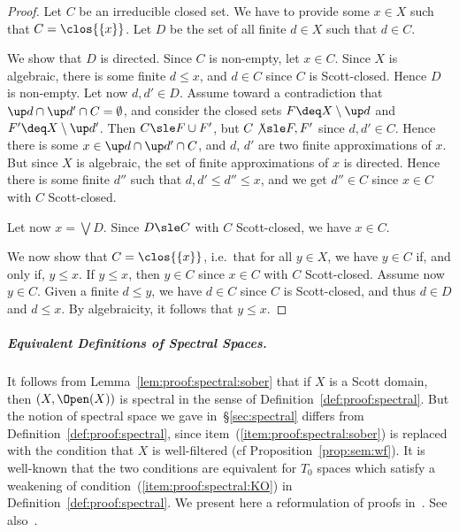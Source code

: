 \begin{proof}
Let $C$ be an irreducible closed set.
We have to provide some $x \in X$ such that $C = \clos{\{x\}}$.
Let $D$ be the set of all finite $d \in X$ such that
$d \in C$.

We show that $D$ is directed.
Since $C$ is non-empty, let $x \in C$.
Since $X$ is algebraic, there is some finite $d \leq x$,
and $d \in C$ since $C$ is Scott-closed.
Hence $D$ is non-empty.
Let now $d, d' \in D$.
Assume toward a contradiction that 
$\up d \cap \up d' \cap C = \emptyset$,
and consider the closed sets $F \deq X \setminus \up d$
and $F' \deq X \setminus \up d'$.
Then $C \sle F \cup F'$, but $C \not\sle F, F'$
since $d,d' \in C$.
Hence there is some $x \in \up d \cap \up d' \cap C$,
and $d$, $d'$ are two finite approximations of $x$.
But since $X$ is algebraic, the set of finite approximations of $x$
is directed.
Hence there is some finite $d''$ such that $d,d' \leq d'' \leq x$,
and we get $d'' \in C$ since $x \in C$ with $C$ Scott-closed.

Let now $x = \bigvee D$.
Since $D \sle C$ with $C$ Scott-closed, we have $x \in C$.

We now show that $C = \clos{\{x\}}$,
i.e.\ that for all $y \in X$, we have $y \in C$ if, and only if, $y \leq x$.
If $y \leq x$, then $y \in C$ since $x \in C$ with $C$ Scott-closed.
Assume now $y \in C$.
Given a finite $d \leq y$, we have $d \in C$ since $C$ is Scott-closed,
and thus $d \in D$ and $d \leq x$.
By algebraicity, it follows that $y \leq x$.
\end{proof}

\subparagraph*{Equivalent Definitions of Spectral Spaces.}
It follows from Lemma~\ref{lem:proof:spectral:sober}
that if $X$ is a Scott domain, then $(X, \Open(X))$
is spectral in the sense of Definition~\ref{def:proof:spectral}.
%
But the notion of spectral space we gave in~\S\ref{sec:spectral}
differs from Definition~\ref{def:proof:spectral},
since item~(\ref{item:proof:spectral:sober}) is replaced with the condition that $X$
is well-filtered (cf Proposition~\ref{prop:sem:wf}).
It is well-known that the two conditions are equivalent for $T_0$ spaces
which satisfy a weakening of condition~(\ref{item:proof:spectral:KO})
in Definition~\ref{def:proof:spectral}.
We present here a reformulation
of proofs in~\cite[\S 8.3]{goubault13book}.
See also~\cite[\S 6.1 and Exercise 6.3.6]{gg24book}.

